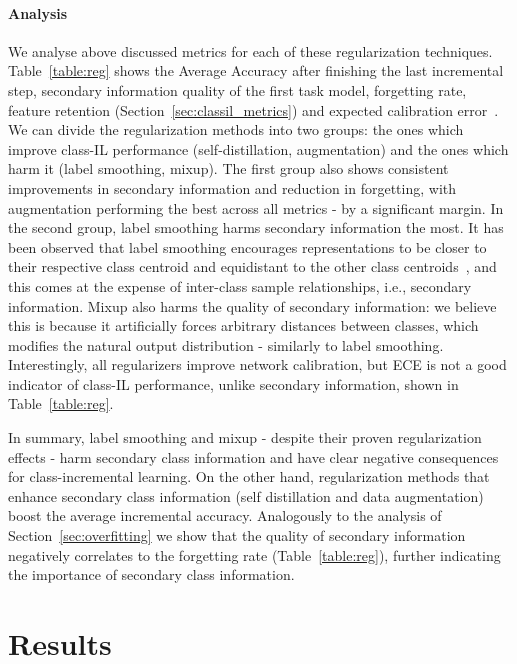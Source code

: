 \documentclass[final]{cvpr}
\begin{document}
\paragraph{Analysis} \hspace{5pt}
We analyse above discussed metrics for each of these regularization techniques. Table~\ref{table:reg} shows the Average Accuracy after finishing the last incremental step, secondary information quality of the first task model, forgetting rate, feature retention (Section~\ref{sec:classil_metrics}) and expected calibration error~\cite{pmlr-v70-guo17a}.
We can divide the regularization methods into two groups: the ones which improve class-IL performance (self-distillation, augmentation) and the ones which harm it (label smoothing, mixup). 
The first group also shows consistent improvements in secondary information and reduction in forgetting, with augmentation performing the best across all metrics - by a significant margin. 
In the second group, label smoothing harms secondary information the most. It has been observed that label smoothing encourages representations to be closer to their respective class centroid and equidistant to the other class centroids~\cite{NIPS2019_8717}, and this comes at the expense of inter-class sample relationships, i.e., secondary information.
Mixup also harms the quality of secondary information: we believe this is because it artificially forces arbitrary distances between classes, which modifies the natural output distribution - similarly to label smoothing. 
Interestingly, all regularizers improve network calibration, but ECE is not a good indicator of class-IL performance, unlike secondary information, shown in Table~\ref{table:reg}.

In summary, label smoothing and mixup - despite their proven regularization effects - harm secondary class information and have clear negative consequences for class-incremental learning.
On the other hand, regularization methods that enhance secondary class information (self distillation and data augmentation) boost the average incremental accuracy.
Analogously to the analysis of Section~\ref{sec:overfitting} we show that the quality of secondary information negatively correlates to the forgetting rate (Table~\ref{table:reg}), further indicating the importance of secondary class information. 



\section{Results}
\end{document}
